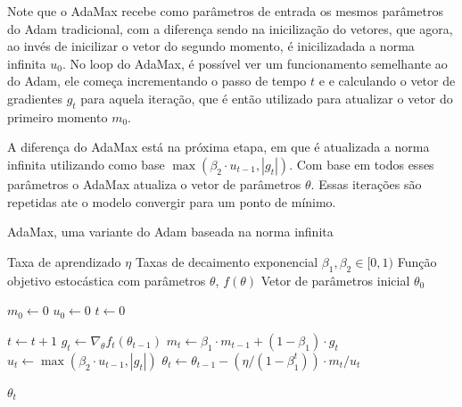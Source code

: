 Note que o AdaMax recebe como parâmetros de entrada os mesmos parâmetros do Adam tradicional, com a diferença sendo na inicilização do vetores, que agora, ao invés de inicilizar o vetor do segundo momento, é inicilizadada a norma infinita $u_0$. No loop do AdaMax, é possível ver um funcionamento semelhante ao do Adam, ele começa incrementando o passo de tempo $t$ e e calculando o vetor de gradientes $g_t$ para aquela iteração, que é então utilizado para atualizar o vetor do primeiro momento $m_0$.

A diferença do AdaMax está na próxima etapa, em que é atualizada a norma infinita utilizando como base $\max(\beta_2 \cdot u_{t-1}, |g_t|)$. Com base em todos esses parâmetros o AdaMax atualiza o vetor de parâmetros $\theta$. Essas iterações são repetidas ate o modelo convergir para um ponto de mínimo.

\begin{algorithm}[H] %
    \caption{AdaMax, uma variante do Adam baseada na norma infinita}
    \label{alg:adamax}
    \begin{algorithmic}[1] %

    \Require Taxa de aprendizado $\eta$
    \Require Taxas de decaimento exponencial $\beta_1, \beta_2 \in [0, 1)$
    \Require Função objetivo estocástica com parâmetros $\theta$, $f(\theta)$
    \Require Vetor de parâmetros inicial $\theta_0$

    \State $m_0 \leftarrow 0$ 
    \State $u_0 \leftarrow 0$ 
    \State $t \leftarrow 0$ 

        \State $t \leftarrow t + 1$
        \State $g_t \leftarrow \nabla_\theta f_t(\theta_{t-1})$ 
        \State $m_t \leftarrow \beta_1 \cdot m_{t-1} + (1 - \beta_1) \cdot g_t$ 
        \State $u_t \leftarrow \max(\beta_2 \cdot u_{t-1}, |g_t|)$ 
        \State $\theta_t \leftarrow \theta_{t-1} - (\eta / (1 - \beta_1^t)) \cdot m_t / u_t$ 
    \EndWhile

    \State \Return $\theta_t$ 
    \end{algorithmic}
\end{algorithm}

